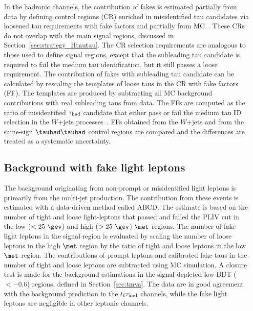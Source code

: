 In the hadronic channels, the contribution of fakes is estimated partially from data by defining control regions (CR)
enriched in misidentified
tau candidates via loosened tau requirements with fake factors and partially from MC~\cite{ATLAS-CONF-2021-044}.
These CRs do not overlap with the main signal regions, discussed in Section~\ref{sec:strategy_Htautau}.
The CR selection requirements are analogous to those used to define signal regions, except
that the subleading tau candidate is required to fail the medium tau identification, but it still passes a loose requirement.
The contribution of fakes with subleading tau candidate can be calculated by rescaling the templates of loose taus in the CR
with fake factors (FF).
The templates are produced by subtracting all MC background contributions with real subleading taus from data.
The FFs are computed as the ratio of misidentified $\tau_\text{had}$ candidate that either pass or fail the medium tau ID selection in the
$W$+jets processes~\cite{ATLAS-CONF-2021-044}. 
FFs obtained from the $W$+jets and from the same-sign $\thadhad$ control regions are compared and the differences are treated as a systematic uncertainty.

\subsection{Background with fake light leptons}
The background originating from non-prompt or misidentified light leptons is primarily from the multi-jet production.
The contribution from these events is estimated with a data-driven method called ABCD.
The estimate is based on the number of tight and loose light-leptons that passed and failed the PLIV cut in the low ($<25~\gev$) and high
($>25~\gev$) $\met$ regions. The number of
fake light leptons in the signal region is evaluated by scaling the number of loose leptons in the high $\met$ region by the ratio of tight and loose leptons in the
low $\met$ region. The contributions of prompt leptons and calibrated fake taus in the number of tight and loose leptons are subtracted using MC simulation.
A closure test is made for the background estimations in the signal depleted low BDT ($<-0.6$) regions, defined in Section~\ref{sec:tmva}.
The data are in good agreement with the background prediction in the
$t_{\ell}\tau_{\mathrm{had}}$ channels, while the fake light leptons are negligible in other leptonic channels. 
